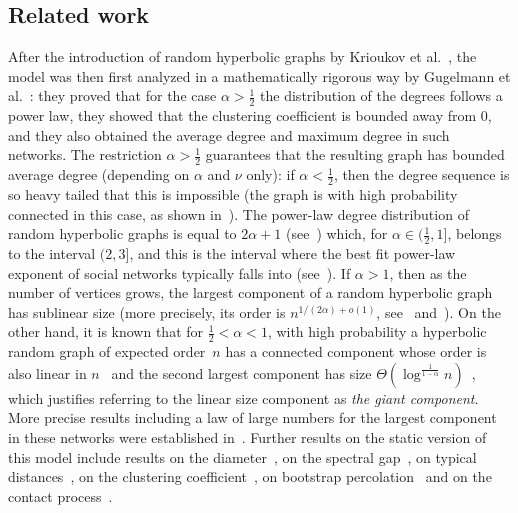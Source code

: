 \documentclass[12pt]{article}
\begin{document}
\subsection{Related work}\label{sec:relatedWork}
%
After the introduction of random hyperbolic graphs by Krioukov et al.~\cite{KPKVB10}, the model was then first analyzed in a mathematically rigorous way by Gugelmann et al.~\cite{GPP12}: they proved that for the case $\alpha > \frac12$ the distribution of the degrees follows a power law, they showed that the clustering coefficient is bounded away from $0$, and they also obtained the average degree and maximum degree in such networks. The restriction $\alpha>\frac12$ guarantees that the resulting graph has bounded average degree (depending on $\alpha$ and $\nu$ only): if $\alpha<\frac12$, then the degree sequence is so heavy tailed that this is impossible (the graph is with high probability connected in this case, as shown in~\cite{BFM13b}). 
The power-law degree distribution of random hyperbolic graphs is equal to $2\alpha+1$ (see~\cite[Theorem 2.2]{GPP12}) which, for $\alpha\in (\frac12, 1]$, belongs to the interval $(2,3]$, and this is the interval where the best fit power-law exponent of social networks typically falls into (see~\cite[p.~69]{barabasiLinked}).
If $\alpha>1$, then as the number of vertices grows, the largest component of a random hyperbolic graph has sublinear size (more precisely, its order is $n^{1/(2\alpha)+o(1)}$, see~\cite[Theorem~1.4]{BFM13} and~\cite{Diel}). On the other hand, it is known that for $\frac12 < \alpha < 1$, with high probability 
a hyperbolic random graph of expected order~$n$ has a connected component whose order is also linear in $n$~\cite[Theorem~1.4]{BFM13} and the second largest component has size $\Theta(\log^{\frac{1}{1-\alpha}} n)$~\cite{km19},  which justifies referring to the linear size component as \emph{the giant component}. 
More precise results including a law of large numbers for the largest component in these networks were established in~\cite{FMLaw}. Further results on the static version of this model include results on the diameter~\cite{km15, fk15, MS19}, on the spectral gap~\cite{KM18}, on typical distances~\cite{ABF}, on the clustering coefficient~\cite{CF16, Clustering}, on bootstrap percolation~\cite{KL} and on the contact process~\cite{Contact}.
\end{document}
